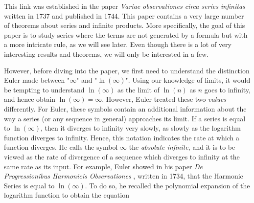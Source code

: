 This link was established in the paper \textit{Variae observationes circa series infinitas} \cite{euler1737variae} written in 1737 and published in 1744. This paper contains a very large number of theorems about series and infinite products. More specifically, the goal of this paper is to study series where the terms are not generated by a formula but with a more intricate rule, as we will see later. Even though there is a lot of very interesting results and theorems, we will only be interested in a few.

However, before diving into the paper, we first need to understand the distinction Euler made between "$\infty$" and "$\ln(\infty)$". Using our knowledge of limits, it would be tempting to understand $\ln(\infty)$ as the limit of $\ln(n)$ as $n$ goes to infinity, and hence obtain $\ln(\infty) = \infty$. However, Euler treated these two \textit{values} differently. For Euler, these symbols contain an additional information about the way a series (or any sequence in general) approaches its limit. If a series is equal to $\ln(\infty)$, then it diverges to infinity very slowly, as slowly as the logarithm function diverges to infinity. Hence, this notation indicates the rate at which a function diverges. He calls the symbol $\infty$ the \textit{absolute infinite}, and it is to be viewed as the rate of divergence of a sequence which diverges to infinity at the same rate as its input. For example, Euler showed in his paper \textit{De Progressionibus Harmonicis Observationes} \cite{euler1740progressionibus}, written in 1734, that the Harmonic Series is equal to $\ln(\infty)$. To do so, he recalled the polynomial expansion of the logarithm function to obtain the equation

